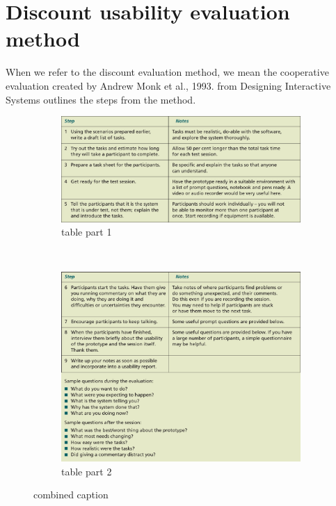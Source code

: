 \section{Discount usability evaluation method}
When we refer to the discount evaluation method, we mean the cooperative evaluation created by Andrew Monk et al., 1993\cite{AndrewMonk}.  from Designing Interactive Systems\cite{CooperativeEval} outlines the steps from the method.

\begin{figure}[]
  \centering      
    \begin{subfigure}[b]{\textwidth}
    \begin{center}
      \includegraphics[scale=0.5]{./pics/UsabilityTableP1}
      \caption{table part 1}
      \label{fig:UsabilityTableP1}
    \end{center}
    \end{subfigure}
    ~\\
    \begin{subfigure}[b]{\textwidth}
    \begin{center}
      \includegraphics[scale=0.5]{./pics/UsabilityTableP2}
      \caption{table part 2}
      \label{fig:UsabilityTableP2}
    \end{center}
    \end{subfigure}
    \caption{combined caption}
    \label{fig:UsabilityTable}
\end{figure}

